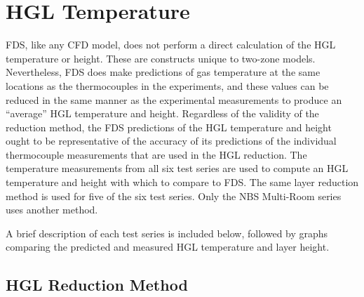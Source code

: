 \chapter{HGL Temperature}

\label{HGL:Chapter}

FDS, like any CFD model, does not perform a direct calculation of the HGL temperature or height. These are constructs unique to two-zone models.
Nevertheless, FDS does make predictions of gas temperature at the same locations as the thermocouples in the experiments, and these
values can be reduced in the same manner as the experimental measurements to produce an ``average'' HGL temperature and height.  Regardless of the
validity of the reduction method, the FDS predictions of the HGL temperature and height ought to be representative of the accuracy of its predictions
of the individual thermocouple measurements that are used in the HGL reduction. The temperature measurements from all six test series are used to
compute an HGL temperature and height with which to compare to FDS.  The same layer reduction method is used for five of the six test series. Only
the NBS Multi-Room series uses another method.

A brief description of each test series is included below, followed by graphs comparing the predicted and measured HGL temperature and layer height.


\section{HGL Reduction Method}

